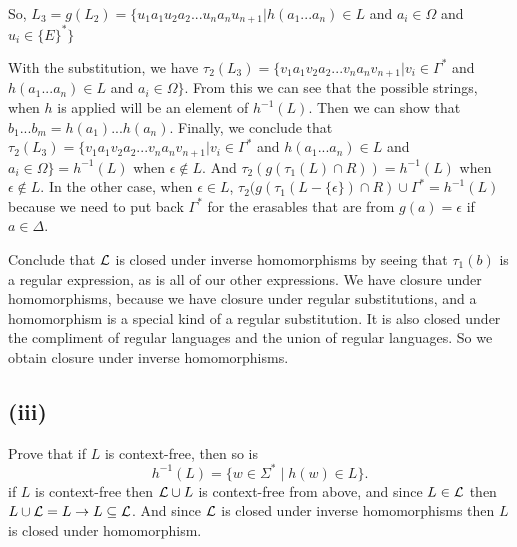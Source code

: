 \documentclass[12pt]{article}
\begin{document}
So, $L_3 = g(L_2)=\{u_1a_1u_2a_2...u_na_nu_{n+1} | h(a_1...a_n) \in L$ and $a_i \in \Omega$ and $u_i \in \{E\}^* \}$ \newline

With the substitution, we have $\tau_2(L_3)= \{v_1a_1v_2a_2...v_na_nv_{n+1} | v_i \in \Gamma^*$ and $h(a_1...a_n) \in L$ and $a_i \in \Omega \}$. From this we can see that the possible strings, when $h$ is applied will be an element of $h^{-1}(L)$. Then we can show that $b_1...b_m=h(a_1)...h(a_n)$. Finally, we conclude that $\tau_2(L_3)= \{v_1a_1v_2a_2...v_na_nv_{n+1} | v_i \in \Gamma^*$ and $h(a_1...a_n) \in L$ and $a_i \in \Omega \} = h^{-1}(L)$ when $\epsilon \not \in L$. And $\tau_2(g(\tau_1(L) \cap R)) = h^{-1}(L)$ when $\epsilon \not \in L$. In the other case, when $\epsilon \in L$, $\tau_2(g(\tau_1(L-\{\epsilon\}) \cap R) \cup \Gamma^* = h^{-1}(L)$ because we need to put back $\Gamma^*$ for the erasables that are from $g(a) = \epsilon$ if $a\in\Delta$. 

\medskip

Conclude that ${\cal L}$ is closed under inverse homomorphisms by seeing that $\tau_1(b)$ is a regular expression, as is all of our other expressions. We have closure under homomorphisms, because we have closure under regular substitutions, and a homomorphism is a special kind of a regular substitution. It is also closed under the compliment of regular languages and the union of regular languages. So we obtain closure under inverse homomorphisms. 

\subsection*{(iii)}

Prove that if $L$ is context-free,
then so is 
$$h^{-1}(L) = \{w\in \Sigma^* \mid  h(w) \in L\}.$$
if $L$ is context-free then ${\cal L} \cup L$ is context-free from above, and since $L \in {\cal L}$ then $L \cup {\cal L} = L \rightarrow L \subseteq {\cal L}$.  And since ${\cal L}$ is closed under inverse homomorphisms then $L$ is closed under homomorphism.
\end{document}
